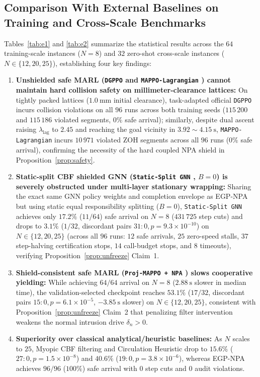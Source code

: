 \subsection{Comparison With External Baselines on Training and Cross-Scale Benchmarks}
Tables~\ref{tab:e1} and \ref{tab:e2} summarize the statistical results across the $64$ training-scale instances ($N=8$) and $32$ zero-shot cross-scale instances ($N\in\{12,20,25\}$), establishing four key findings:
\begin{enumerate}
 \item \textbf{Unshielded safe MARL (\texttt{DGPPO} \cite{zhang2025dgppo} and \texttt{MAPPO-Lagrangian} \cite{gu2023safe}) cannot maintain hard collision safety on millimeter-clearance lattices:} On tightly packed lattices ($1.0\ \mathrm{mm}$ initial clearance), task-adapted official \texttt{DGPPO} incurs collision violations on all $96$ runs across both training seeds ($115\,200$ and $115\,186$ violated segments, $0\%$ safe arrival); similarly, despite dual ascent raising $\lambda_{\mathrm{lag}}$ to $2.45$ and reaching the goal vicinity in $3.92\sim 4.15\ \mathrm s$, \texttt{MAPPO-Lagrangian} incurs $10\,971$ violated ZOH segments across all $96$ runs ($0\%$ safe arrival), confirming the necessity of the hard coupled NPA shield in Proposition~\ref{prop:safety}.
 \item \textbf{Static-split CBF shielded GNN (\texttt{Static-Split GNN} \cite{ames2017cbf,zhang2025gcbf}, $B=0$) is severely obstructed under multi-layer stationary wrapping:} Sharing the exact same GNN policy weights and completion envelope as EGP-NPA but using static equal responsibility splitting ($B=0$), \texttt{Static-Split GNN} achieves only $17.2\%$ ($11/64$) safe arrival on $N=8$ ($431\,725$ step cuts) and drops to $3.1\%$ ($1/32$, discordant pairs $31:0,p=9.3\times 10^{-10}$) on $N\in\{12,20,25\}$ (across all $96$ runs: $12$ safe arrivals, $25$ zero-speed stalls, $37$ step-halving certification stops, $14$ call-budget stops, and $8$ timeouts), verifying Proposition~\ref{prop:unfreeze} Claim~1.
 \item \textbf{Shield-consistent safe MARL (\texttt{Proj-MAPPO + NPA} \cite{wabersich2021,liu2026saferl}) slows cooperative yielding:} While achieving $64/64$ arrival on $N=8$ ($2.88\ \mathrm s$ slower in median time), the validation-selected checkpoint reaches $53.1\%$ ($17/32$, discordant pairs $15:0,p=6.1\times 10^{-5}$, $-3.85\ \mathrm s$ slower) on $N\in\{12,20,25\}$, consistent with Proposition~\ref{prop:unfreeze} Claim~2 that penalizing filter intervention weakens the normal intrusion drive $\delta_n>0$.
 \item \textbf{Superiority over classical analytical/heuristic baselines:} As $N$ scales to $25$, Myopic CBF filtering and Circulation Heuristic drop to $15.6\%$ ($27:0,p=1.5\times 10^{-8}$) and $40.6\%$ ($19:0,p=3.8\times 10^{-6}$), whereas EGP-NPA achieves $96/96$ ($100\%$) safe arrival with $0$ step cuts and $0$ audit violations.
\end{enumerate}

